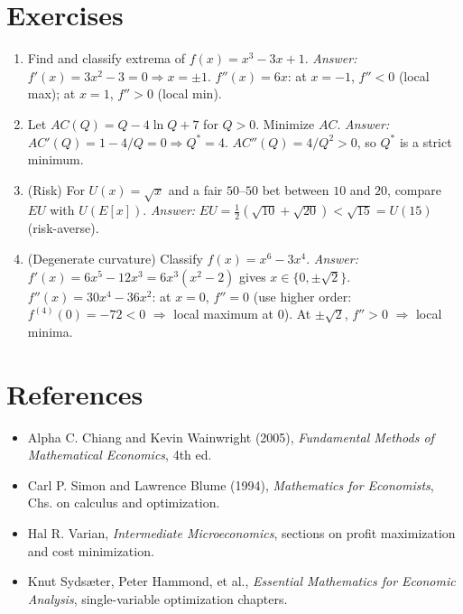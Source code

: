\documentclass[12pt]{article}
\theoremstyle{definition}
\begin{document}
\section*{Exercises}
\begin{enumerate}[leftmargin=1.5em]
\item Find and classify extrema of $f(x)=x^3-3x+1$. \emph{Answer:} $f'(x)=3x^2-3=0\Rightarrow x=\pm1$. $f''(x)=6x$: at $x=-1$, $f''<0$ (local max); at $x=1$, $f''>0$ (local min).
\item Let $AC(Q)=Q-4\ln Q +7$ for $Q>0$. Minimize $AC$. \emph{Answer:} $AC'(Q)=1-4/Q=0\Rightarrow Q^\ast=4$. $AC''(Q)=4/Q^2>0$, so $Q^\ast$ is a strict minimum.
\item (Risk) For $U(x)=\sqrt{x}$ and a fair $50$--$50$ bet between $10$ and $20$, compare $EU$ with $U(E[x])$. \emph{Answer:} $EU=\tfrac12(\sqrt{10}+\sqrt{20})<\sqrt{15}=U(15)$ (risk-averse).
\item (Degenerate curvature) Classify $f(x)=x^6-3x^4$. \emph{Answer:} $f'(x)=6x^5-12x^3=6x^3(x^2-2)$ gives $x\in\{0,\pm\sqrt{2}\}$. $f''(x)=30x^4-36x^2$: at $x=0$, $f''=0$ (use higher order: $f^{(4)}(0)=-72<0$ $\Rightarrow$ local maximum at $0$). At $\pm\sqrt{2}$, $f''>0$ $\Rightarrow$ local minima.
\end{enumerate}

\section*{References}
\begin{itemize}[leftmargin=1.5em]
\item Alpha C. Chiang and Kevin Wainwright (2005), \emph{Fundamental Methods of Mathematical Economics}, 4th ed.
\item Carl P. Simon and Lawrence Blume (1994), \emph{Mathematics for Economists}, Chs. on calculus and optimization.
\item Hal R. Varian, \emph{Intermediate Microeconomics}, sections on profit maximization and cost minimization.
\item Knut Syds{\ae}ter, Peter Hammond, et al., \emph{Essential Mathematics for Economic Analysis}, single-variable optimization chapters.
\end{itemize}
\end{document}
